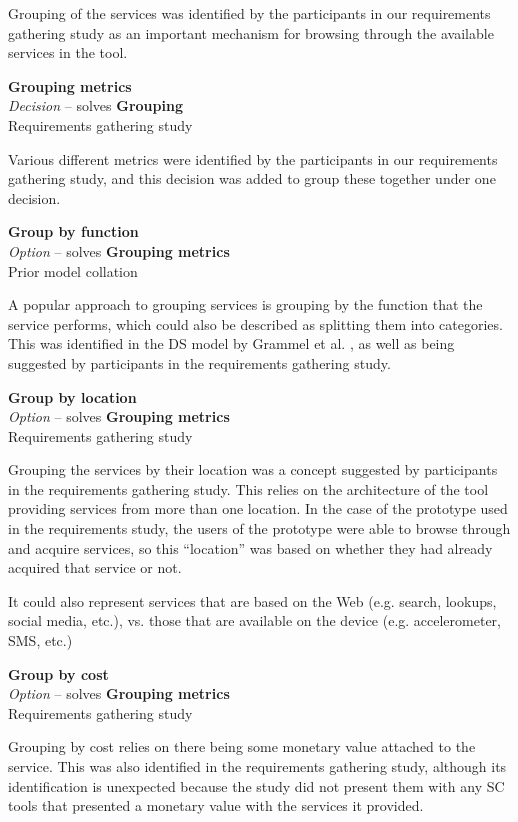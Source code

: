Grouping of the services was identified by the participants in our requirements gathering study as an important mechanism for browsing through the available services in the tool.

\textbf{Grouping metrics} \\ \emph{Decision} -- solves \textbf{Grouping} \\ Requirements gathering study

Various different metrics were identified by the participants in our requirements gathering study, and this decision was added to group these together under one decision.

\textbf{Group by function} \\ \emph{Option} -- solves \textbf{Grouping metrics} \\ Prior model collation \cite{Grammel2010}

A popular approach to grouping services is grouping by the function that the service performs, which could also be described as splitting them into categories. This was identified in the DS model by Grammel et al. \cite{Grammel2010}, as well as being suggested by participants in the requirements gathering study.

\textbf{Group by location} \\ \emph{Option} -- solves \textbf{Grouping metrics} \\ Requirements gathering study

Grouping the services by their location was a concept suggested by participants in the requirements gathering study. This relies on the architecture of the tool providing services from more than one location. In the case of the prototype used in the requirements study, the users of the prototype were able to browse through and acquire services, so this ``location'' was based on whether they had already acquired that service or not.

It could also represent services that are based on the Web (e.g. search, lookups, social media, etc.), vs. those that are available on the device (e.g. accelerometer, SMS, etc.)

\textbf{Group by cost} \\ \emph{Option} -- solves \textbf{Grouping metrics} \\ Requirements gathering study

Grouping by cost relies on there being some monetary value attached to the service. This was also identified in the requirements gathering study, although its identification is unexpected because the study did not present them with any SC tools that presented a monetary value with the services it provided.


